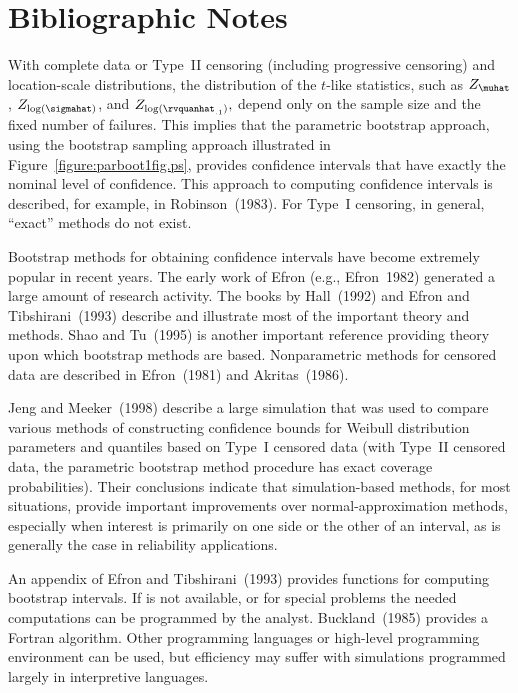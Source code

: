 \section*{Bibliographic Notes}
With complete data or Type~II censoring (including progressive
censoring) and location-scale distributions, the distribution of the
$t$-like statistics, such as $Z_{\muhat}$, $Z_{\log(\sigmahat)}$, and
$Z_{\log(\rvquanhat_{.1})},$ depend only on the sample size and the
fixed number of failures. This implies that the parametric bootstrap
approach, using the bootstrap sampling approach illustrated in
Figure~\ref{figure:parboot1fig.ps}, provides confidence intervals that
have exactly the nominal level of confidence. This approach to
computing confidence intervals is described, for example, in
Robinson~(1983). For Type~I censoring, in general, ``exact'' methods
do not exist.


Bootstrap methods for obtaining confidence intervals have become
extremely popular in recent years.  The early work of Efron (e.g.,
Efron~1982) generated a large amount of research activity.  The books
by Hall~(1992) and Efron and Tibshirani~(1993) describe and illustrate
most of the important theory and methods. Shao and Tu~(1995) is
another important reference providing theory upon which bootstrap
methods are based. Nonparametric methods for censored data are
described in Efron~(1981) and Akritas~(1986).

Jeng and Meeker~(1998) describe a large simulation that was used to
compare various methods of constructing confidence bounds for
Weibull distribution parameters and quantiles based on Type~I
censored data (with Type~II censored data, the parametric bootstrap
method procedure has exact coverage probabilities).  Their
conclusions indicate that simulation-based methods, for most
situations, provide important improvements over normal-approximation
methods, especially when interest is primarily on one side or the
other of an interval, as is generally the case in reliability
applications.

An appendix of Efron and Tibshirani~(1993) provides \splus functions
for computing bootstrap intervals. If \splus is not available, or
for special problems the needed computations can be programmed by the
analyst. Buckland~(1985) provides a Fortran algorithm. Other
programming languages or high-level programming environment can be
used, but efficiency may suffer with simulations programmed largely in
interpretive languages.

